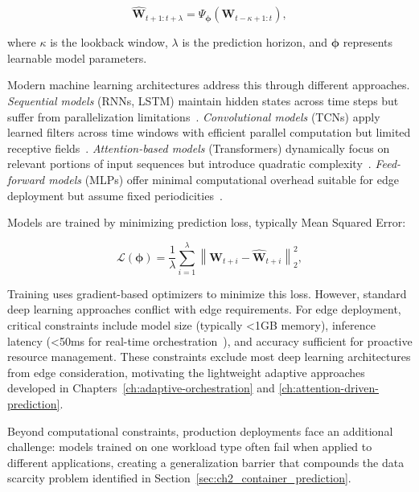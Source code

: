 \begin{equation}
\hat{\mathbf{W}}_{t+1:t+\lambda} = \Psi_{\boldsymbol{\phi}}\left( \mathbf{W}_{t-\kappa+1:t} \right),
\end{equation}

where $\kappa$ is the lookback window, $\lambda$ is the prediction horizon, and $\boldsymbol{\phi}$ represents learnable model parameters.

Modern machine learning architectures address this through different approaches. \textit{Sequential models} (\acp{RNN}, \ac{LSTM}) maintain hidden states across time steps but suffer from parallelization limitations~\cite{hochreiter1998vanishing}. \textit{Convolutional models} (\acp{TCN}) apply learned filters across time windows with efficient parallel computation but limited receptive fields~\cite{donghao2024moderntcn}. \textit{Attention-based models} (Transformers) dynamically focus on relevant portions of input sequences but introduce quadratic complexity~\cite{vaswani2017attention}. \textit{Feed-forward models} (\acp{MLP}) offer minimal computational overhead suitable for edge deployment but assume fixed periodicities~\cite{sparseTSF}.

Models are trained by minimizing prediction loss, typically Mean Squared Error:

\begin{equation}
\mathcal{L}(\boldsymbol{\phi}) = \frac{1}{\lambda} \sum_{i=1}^{\lambda} \left\| \mathbf{W}_{t+i} - \hat{\mathbf{W}}_{t+i} \right\|_2^2,
\end{equation}

Training uses gradient-based optimizers to minimize this loss. However, standard deep learning approaches conflict with edge requirements. For edge deployment, critical constraints include model size (typically <1\ac{GB} memory), inference latency (<50ms for real-time orchestration~\cite{8334540, 9500858}), and accuracy sufficient for proactive resource management. These constraints exclude most deep learning architectures from edge consideration, motivating the lightweight adaptive approaches developed in Chapters~\ref{ch:adaptive-orchestration} and \ref{ch:attention-driven-prediction}.

Beyond computational constraints, production deployments face an additional challenge: models trained on one workload type often fail when applied to different applications, creating a generalization barrier that compounds the data scarcity problem identified in Section~\ref{sec:ch2_container_prediction}.